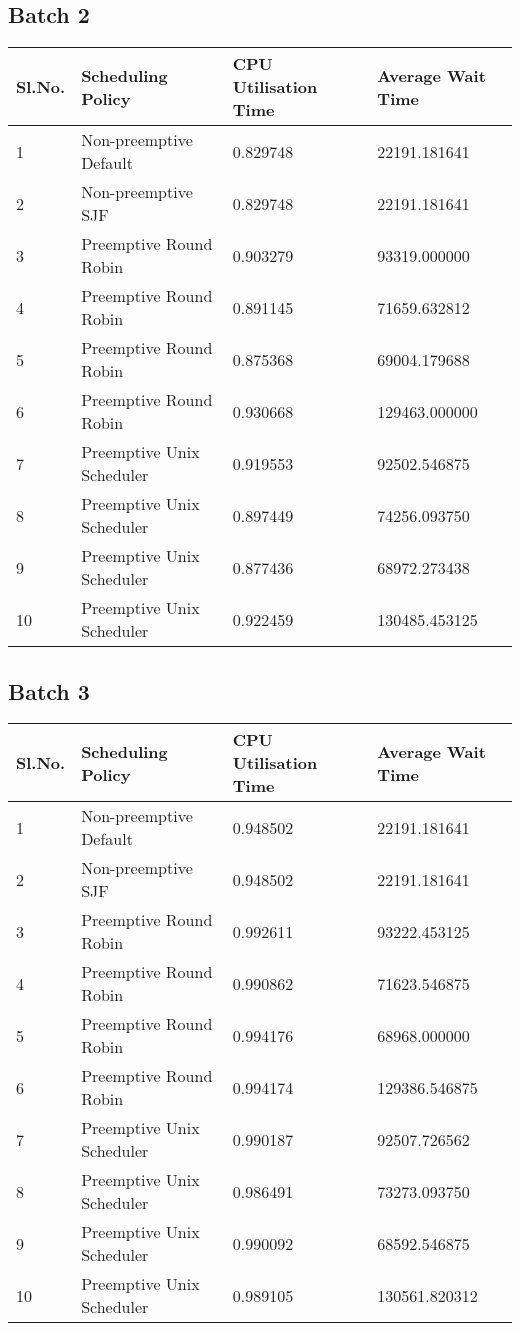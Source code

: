 \documentclass{article}
\begin{document}
\subsection{Batch 2}
\begin{center}
    \begin{tabular}{| l | l | l | l |}
    \hline
    Sl.No. & Scheduling Policy & CPU Utilisation Time & Average Wait Time \\ \hline
    1 & Non-preemptive Default & 0.829748 & 22191.181641 \\
    2 & Non-preemptive SJF & 0.829748 & 22191.181641 \\
    3 & Preemptive Round Robin & 0.903279 & 93319.000000 \\
    4 & Preemptive Round Robin & 0.891145 & 71659.632812 \\
    5 & Preemptive Round Robin & 0.875368 & 69004.179688 \\
    6 & Preemptive Round Robin & 0.930668 & 129463.000000 \\
    7 & Preemptive Unix Scheduler & 0.919553 & 92502.546875 \\
    8 & Preemptive Unix Scheduler & 0.897449 & 74256.093750 \\
    9 & Preemptive Unix Scheduler & 0.877436 & 68972.273438 \\
    10 & Preemptive Unix Scheduler & 0.922459 & 130485.453125 \\
    \hline
    \end{tabular}
\end{center}
\subsection{Batch 3}
\begin{center}
    \begin{tabular}{| l | l | l | l |}
    \hline
    Sl.No. & Scheduling Policy & CPU Utilisation Time & Average Wait Time \\ \hline
    1 & Non-preemptive Default & 0.948502 & 22191.181641 \\
    2 & Non-preemptive SJF & 0.948502 & 22191.181641 \\
    3 & Preemptive Round Robin & 0.992611 & 93222.453125 \\
    4 & Preemptive Round Robin & 0.990862 & 71623.546875 \\
    5 & Preemptive Round Robin & 0.994176 & 68968.000000 \\
    6 & Preemptive Round Robin & 0.994174 & 129386.546875 \\
    7 & Preemptive Unix Scheduler & 0.990187 & 92507.726562 \\
    8 & Preemptive Unix Scheduler & 0.986491 & 73273.093750 \\
    9 & Preemptive Unix Scheduler & 0.990092 & 68592.546875 \\
    10 & Preemptive Unix Scheduler & 0.989105 & 130561.820312 \\
    \hline
    \end{tabular}
\end{center}
\end{document}
